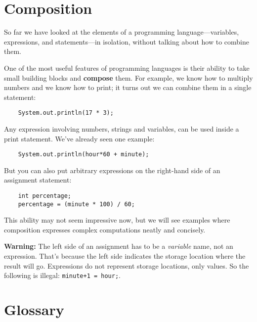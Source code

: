 \documentclass[12pt]{book}
\def\WARNING{\textbf{Warning:}}
\theoremstyle{definition}
\begin{document}
\section{Composition}

So far we have looked at the elements of a programming
language---variables, expressions, and statements---in
isolation, without talking about how to combine them.

One of the most useful features of programming languages
is their ability to take small building blocks and
{\bf compose} them.  For example, we know how to multiply
numbers and we know how to print; it turns out we can
combine them in a single statement:

\begin{lstlisting}
    System.out.println(17 * 3);
\end{lstlisting}
%
Any expression involving numbers, strings
and variables, can be used inside a print statement.  We've
already seen one example:

\begin{lstlisting}
    System.out.println(hour*60 + minute);
\end{lstlisting}
%
But you can also put arbitrary expressions on the right-hand
side of an assignment statement:

\begin{lstlisting}
    int percentage;
    percentage = (minute * 100) / 60;
\end{lstlisting}
%
This ability may not seem impressive now, but we will see
examples where composition 
expresses complex computations neatly and concisely.

\WARNING{} The left side of an assignment
has to be a {\em variable} name, not an expression.
That's because the left side indicates the storage location
where the result will go.  Expressions
do not represent storage locations, only values.  So the
following is illegal:  {\tt minute+1 = hour;}.

\section{Glossary}
\end{document}
